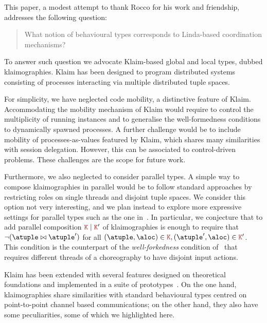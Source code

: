 

This paper, a modest attempt to thank Rocco for his work and
friendship, addresses the following question:
%
\begin{quote}
  What notion of behavioural types corresponds to Linda-based
  coordination mechanisms?
\end{quote}
%
To answer such question we advocate Klaim-based global and local
types, dubbed klaimographies.
%
Klaim has been designed to program distributed systems consisting of
processes interacting via multiple distributed tuple spaces.

For simplicity, we have neglected code mobility, a distinctive feature
of Klaim.
%
Accommodating the mobility mechanism of Klaim would require to control
the multiplicity of running instances and to generalise the
well-formedness conditions to dynamically spawned processes.
%
A further challenge would be to include mobility of
processes-as-values featured by Klaim, which shares many
similarities with session delegation.
%
However, this can be associated to control-driven problems.
%
These challenges are the scope for future work.

Furthermore, we also neglected to consider parallel types.
%
A simple way to compose klaimographies in parallel would be to follow standard
approaches by restricting roles on single threads and disjoint tuple
spaces.
%
We consider this option not very interesting, and we plan 
instead to explore more expressive
settings for parallel types such as the one in~\cite{gt16,gt17}.
%
In particular, we conjecture that to add parallel composition
$\aK \mid \aK'$ of klaimographies is enough to require that
$\neg(\atuple \matches \atuple')$ for all
$(\atuple, \aloc) \in \aK, (\atuple', \aloc) \in \aK'$.
%
This condition is the counterpart of the \emph{well-forkedness}
condition of~\cite{gt16,gt17} that requires different threads of
a choreography to have disjoint input actions.

Klaim has been extended with several features designed on theoretical
foundations and implemented in a suite of
prototypes~\cite{klaim}.
%
On the one hand, klaimographies share similarities with standard
behavioural types centred on point-to-point channel based
communications; on the other hand, they also have some peculiarities,
some of which we highlighted here.


